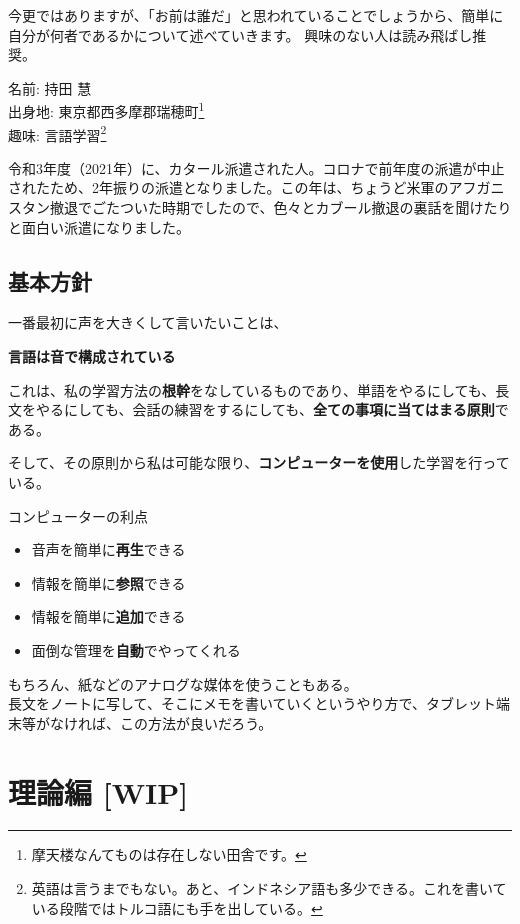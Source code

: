 \documentclass[
]{book}
\providecommand{\tightlist}{%
  \setlength{\itemsep}{0pt}\setlength{\parskip}{0pt}}
\begin{document}
今更ではありますが、「お前は誰だ」と思われていることでしょうから、簡単に自分が何者であるかについて述べていきます。 興味のない人は読み飛ばし推奨。

名前: 持田 慧\\
出身地: 東京都西多摩郡瑞穂町\footnote{摩天楼なんてものは存在しない田舎です。}\\
趣味: 言語学習\footnote{英語は言うまでもない。あと、インドネシア語も多少できる。これを書いている段階ではトルコ語にも手を出している。}

令和3年度（2021年）に、カタール派遣された人。コロナで前年度の派遣が中止されたため、2年振りの派遣となりました。この年は、ちょうど米軍のアフガニスタン撤退でごたついた時期でしたので、色々とカブール撤退の裏話を聞けたりと面白い派遣になりました。

\hypertarget{principle}{%
\chapter{基本方針}\label{principle}}

一番最初に声を大きくして言いたいことは、

{\textbf{言語は音で構成されている}}

これは、私の学習方法の\textbf{根幹}をなしているものであり、単語をやるにしても、長文をやるにしても、会話の練習をするにしても、\textbf{全ての事項に当てはまる原則}である。

そして、その原則から私は可能な限り、\textbf{コンピューターを使用}した学習を行っている。

コンピューターの利点

\begin{itemize}
\tightlist
\item
  音声を簡単に\textbf{再生}できる
\item
  情報を簡単に\textbf{参照}できる
\item
  情報を簡単に\textbf{追加}できる
\item
  面倒な管理を\textbf{自動}でやってくれる
\end{itemize}

もちろん、紙などのアナログな媒体を使うこともある。\\
長文をノートに写して、そこにメモを書いていくというやり方で、タブレット端末等がなければ、この方法が良いだろう。

\hypertarget{part-ux7406ux8ad6ux7de8-wip}{%
\part{理論編 {[}WIP{]}}\label{part-ux7406ux8ad6ux7de8-wip}}
\end{document}
